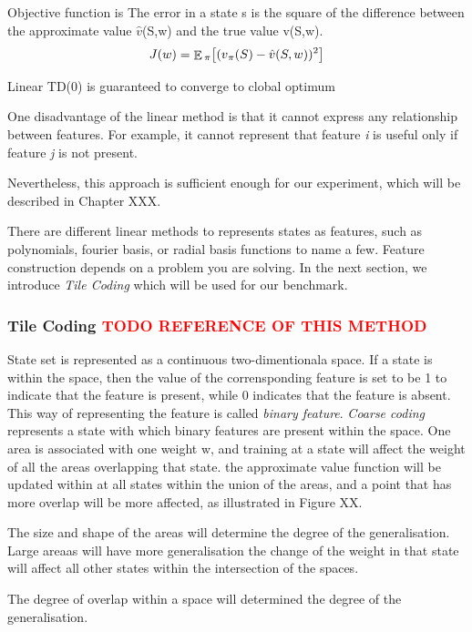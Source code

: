 \documentclass[12pt,twoside]{report}
\theoremstyle{plain}
\theoremstyle{definition}
\DeclareMathOperator{\E}{\mathbb{E}}
\begin{document}
Objective function is 
The error in a state s is the square of the difference between the approximate value 
$\hat{v}$(S,w) and the true value v(S,w). 
\begin{equation}
J(w) = \displaystyle \E \textsubscript{$\pi$} \big[ (v\textsubscript{$\pi$}(S) -  \hat{v}(S,w))\textsuperscript{2} \big]
\end{equation}

Linear TD(0) is guaranteed to converge to clobal optimum

One disadvantage of the linear method is that it cannot express any relationship between features. For example, it cannot represent that feature \textit{i} is useful only if feature \textit{j} is not present. 

Nevertheless,  this approach is sufficient enough for our experiment, which will be described in Chapter XXX.

There are different linear methods to represents states as features, such as polynomials, fourier basis, or radial basis functions to name a few. Feature construction depends on a problem you are solving. In the next section, we introduce \textit{Tile Coding} which will be used for our benchmark. 

\subsubsection{Tile Coding \textcolor{red}{TODO REFERENCE OF THIS METHOD}}

State set is represented as a continuous two-dimentionala space. If a state is within the space, then the value of the  corrensponding feature is set to be 1 to indicate that the feature is present, while 0 indicates that the feature is absent. This way of representing the feature is called \textit{binary feature}.  \textit{Coarse coding} represents a state with which binary features are present within the space. 
One area is associated with one weight w, and training at a state will affect the weight of all the areas overlapping that state. the approximate value function will be updated within at all states within the union of the areas, and a point that has more overlap will be more affected, as illustrated in Figure XX.

The size and shape of the areas will determine the degree of the generalisation. Large areaas will have more generalisation
the change of the weight in that state will affect all other states within the intersection of the spaces. 

The degree of overlap within a space will determined the degree of the generalisation. 
\end{document}
